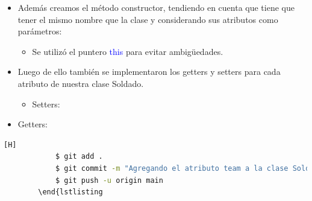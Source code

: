 \documentclass{article}
\begin{document}
        \begin{itemize}
            \item Además creamos el método constructor, tendiendo en cuenta que tiene que tener el mismo nombre que la clase y considerando sus atributos como parámetros:
            \begin{itemize}
                \item Se utilizó el puntero \textcolor{blue}{this} para evitar ambigüedades.
            \end{itemize}
        \end{itemize}

        

        \begin{itemize}
            \item Luego de ello también se implementaron los getters y setters para cada atributo de nuestra clase Soldado.
            \begin{itemize}
                \item Setters: 
            \end{itemize}
        \end{itemize}

        

        \begin{itemize}
            \begin{itemize}
                \item Getters: 
            \end{itemize}
        \end{itemize}

        

        \begin{lstlisting}[language=bash,caption={Commit \href{https://github.com/hernanchoquehuanca/fp2-23b/commit/a43020e7ffdcd7aca45a9bd5bcc58bf90ce02059}{a43020e} - \href{https://github.com/hernanchoquehuanca/fp2-23b/commit/598a62d5d65db6832192e50b6ef383709a550043}{61b7b8e}: Se concluía la clase Soldado.java agregando su atributo team, que en el lab06 no se tomaba en cuentat}][H]
    		$ git add .
    		$ git commit -m "Agregando el atributo team a la clase Soldado.java, esto servira para usarlo al momento de mostrar la tabla y sea mas funcional, ademas se adapto el codigo para trabajar con este atributo"			
    		$ git push -u origin main
    	\end{lstlisting
        \end{lstlisting}
\end{document}
